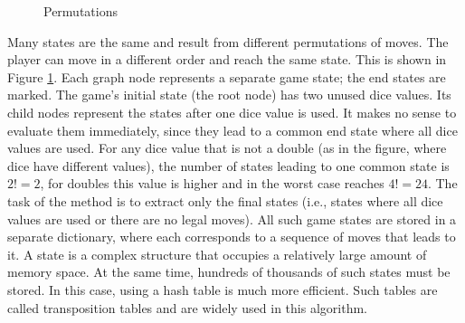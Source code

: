 \begin{figure}[H]
    \centering
    \label{Permutations}
    \caption{Permutations}
\end{figure}
Many states are the same and result from different permutations of moves. The player can move in a different order and reach the same state.
This is shown in Figure \ref{Permutations}. Each graph node represents a separate game state; the end states are marked. The game's initial state (the root node) has two unused dice values. Its child nodes represent the states after one dice value is used. It makes no sense to evaluate them immediately, since they lead to a common end state where all dice values are used. For any dice value that is not a double (as in the figure, where dice have different values), the number of states leading to one common state is $2! = 2$, for doubles this value is higher and in the worst case reaches $4! = 24$. The task of the method is to extract only the final states (i.e., states where all dice values are used or there are no legal moves).
All such game states are stored in a separate dictionary, where each corresponds to a sequence of moves that leads to it. A state is a complex structure that occupies a relatively large amount of memory space. At the same time, hundreds of thousands of such states must be stored. In this case, using a hash table is much more efficient. Such tables are called transposition tables and are widely used in this algorithm.

